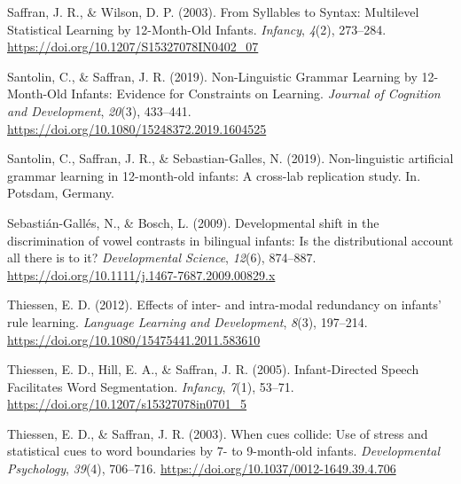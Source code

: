 \documentclass[english,man,man,floatsintext]{apa6}
\begin{document}
\leavevmode\hypertarget{ref-saffran2003}{}%
Saffran, J. R., \& Wilson, D. P. (2003). From Syllables to Syntax: Multilevel Statistical Learning by 12-Month-Old Infants. \emph{Infancy}, \emph{4}(2), 273--284. \url{https://doi.org/10.1207/S15327078IN0402_07}

\leavevmode\hypertarget{ref-santolin2019}{}%
Santolin, C., \& Saffran, J. R. (2019). Non-Linguistic Grammar Learning by 12-Month-Old Infants: Evidence for Constraints on Learning. \emph{Journal of Cognition and Development}, \emph{20}(3), 433--441. \url{https://doi.org/10.1080/15248372.2019.1604525}

\leavevmode\hypertarget{ref-santolin2019a}{}%
Santolin, C., Saffran, J. R., \& Sebastian-Galles, N. (2019). Non-linguistic artificial grammar learning in 12-month-old infants: A cross-lab replication study. In. Potsdam, Germany.

\leavevmode\hypertarget{ref-sebastian-galles2009}{}%
Sebastián-Gallés, N., \& Bosch, L. (2009). Developmental shift in the discrimination of vowel contrasts in bilingual infants: Is the distributional account all there is to it? \emph{Developmental Science}, \emph{12}(6), 874--887. \url{https://doi.org/10.1111/j.1467-7687.2009.00829.x}

\leavevmode\hypertarget{ref-thiessen2012}{}%
Thiessen, E. D. (2012). Effects of inter- and intra-modal redundancy on infants' rule learning. \emph{Language Learning and Development}, \emph{8}(3), 197--214. \url{https://doi.org/10.1080/15475441.2011.583610}

\leavevmode\hypertarget{ref-thiessen2005}{}%
Thiessen, E. D., Hill, E. A., \& Saffran, J. R. (2005). Infant-Directed Speech Facilitates Word Segmentation. \emph{Infancy}, \emph{7}(1), 53--71. \url{https://doi.org/10.1207/s15327078in0701_5}

\leavevmode\hypertarget{ref-thiessen2003}{}%
Thiessen, E. D., \& Saffran, J. R. (2003). When cues collide: Use of stress and statistical cues to word boundaries by 7- to 9-month-old infants. \emph{Developmental Psychology}, \emph{39}(4), 706--716. \url{https://doi.org/10.1037/0012-1649.39.4.706}

\endgroup

\clearpage
\makeatletter
\efloat@restorefloats
\makeatother
\end{document}

